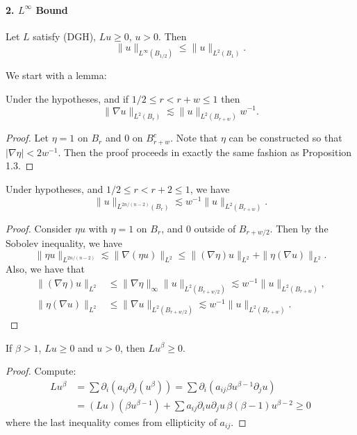 \paragraph{2. $L^\infty$ Bound}
\begin{theorem}
Let $L$ satisfy (DGH), $Lu\geq0$, $u>0$. Then
\[\|u\|_{L^\infty(B_{1/2})}\leq\|u\|_{L^2(B_1)}.\]
\end{theorem}
We start with a lemma:
\begin{lemma}[2.1]
Under the hypotheses, and if $1/2\leq r<r+w\leq1$ then
\[\|\nabla u\|_{L^2(B_r)}\lesssim\|u\|_{L^2(B_{r+w})}w^{-1}.\]
\end{lemma}
\begin{proof}
Let $\eta=1$ on $B_r$ and $0$ on $B_{r+w}^c$. Note that $\eta$ can be constructed so that $|\nabla\eta|<2w^{-1}$. Then the proof proceeds in exactly the same fashion as Proposition 1.3.
\end{proof}
\begin{lemma}[2.2]
Under hypotheses, and $1/2\leq r<r+2\leq1$, we have
\[\|u\|_{L^{2n/(n-2)}(B_r)}\lesssim w^{-1}\|u\|_{L^2(B_{r+w})}.\]
\end{lemma}
\begin{proof}
Consider $\eta u$ with $\eta=1$ on $B_r$, and $0$ outside of $B_{r+w/2}$. Then by the Sobolev inequality, we have
\[\|\eta u\|_{L^{2n/(n-2)}}\lesssim\|\nabla(\eta u)\|_{L^2}\leq\|(\nabla\eta)u\|_{L^2}+\|\eta(\nabla u)\|_{L^2}.\]
Also, we have that
\begin{align*}
\|(\nabla\eta)u\|_{L^2}&\leq\|\nabla\eta\|_\infty\|u\|_{L^2(B_{r+w/2})}\lesssim w^{-1}\|u\|_{L^2(B_{r+w})},\\
\|\eta(\nabla u)\|_{L^2}&\leq\|\nabla u\|_{L^2(B_{r+w/2})}\lesssim w^{-1}\|u\|_{L^2(B_{r+w})}.
\end{align*}
\end{proof}
\begin{lemma}[2.3]
If $\beta>1$, $Lu\geq0$ and $u>0$, then $Lu^\beta\geq0$.
\end{lemma}
\begin{proof}
Compute:
\begin{align*}
Lu^\beta&=\sum\partial_i(a_{ij}\partial_j(u^\beta))=\sum\partial_i(a_{ij}\beta u^{\beta-1}\partial_j u)\\
&=(Lu)(\beta u^{\beta-1})+\sum a_{ij}\partial_i u\partial_j u\,\beta(\beta-1)u^{\beta-2}\geq0
\end{align*}
where the last inequality comes from ellipticity of $a_{ij}$.
\end{proof}
